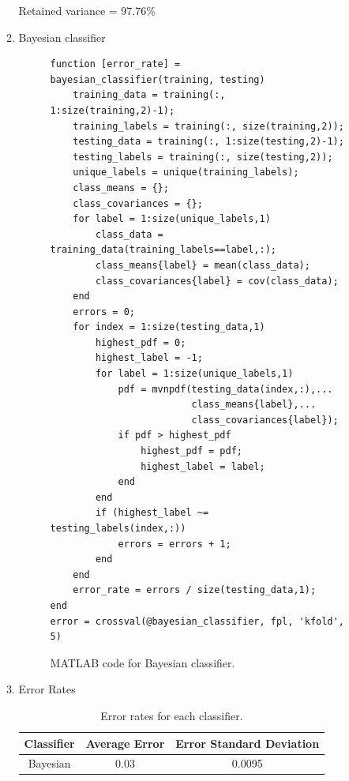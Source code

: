 \documentclass[12pt]{article}
\begin{document}
\begin{enumerate}
\begin{enumerate}
Retained variance = 97.76\%
\item Bayesian classifier \\
\begin{figure}[H]
\begin{verbatim}
function [error_rate] = bayesian_classifier(training, testing)
    training_data = training(:, 1:size(training,2)-1);
    training_labels = training(:, size(training,2));
    testing_data = training(:, 1:size(testing,2)-1);
    testing_labels = training(:, size(testing,2));
    unique_labels = unique(training_labels);
    class_means = {};
    class_covariances = {};
    for label = 1:size(unique_labels,1)
        class_data = training_data(training_labels==label,:);
        class_means{label} = mean(class_data);
        class_covariances{label} = cov(class_data);
    end
    errors = 0;
    for index = 1:size(testing_data,1)
        highest_pdf = 0;
        highest_label = -1;
        for label = 1:size(unique_labels,1)
            pdf = mvnpdf(testing_data(index,:),...
                         class_means{label},...
                         class_covariances{label});
            if pdf > highest_pdf
                highest_pdf = pdf;
                highest_label = label;
            end
        end
        if (highest_label ~= testing_labels(index,:))
            errors = errors + 1;
        end
    end
    error_rate = errors / size(testing_data,1);    
end
error = crossval(@bayesian_classifier, fpl, 'kfold', 5)
\end{verbatim}
\caption{MATLAB code for Bayesian classifier.}
\end{figure}
\item Error Rates
\begin{table}[H]
\begin{tabular}{ccc}
Classifier & Average Error & Error Standard Deviation \\ \hline
Bayesian & 0.03 & 0.0095 \\
\end{tabular}
\caption{Error rates for each classifier.}
\end{table}
\end{enumerate}
\end{enumerate}
\end{document}
